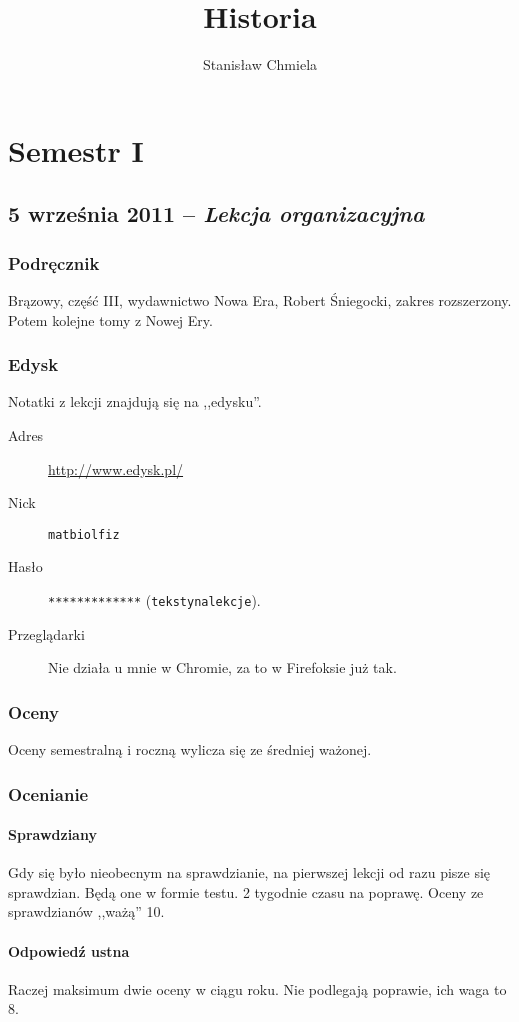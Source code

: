 \documentclass [a4paper, 11pt, oneside]{book}
\author{Stanisław Chmiela}
\title{Historia}
\begin{document}
\maketitle
\tableofcontents
\part{Semestr I}
\chapter{5 września 2011 -- \textit{Lekcja organizacyjna}}
\section{Podręcznik}
    Brązowy, część III, wydawnictwo Nowa Era, Robert Śniegocki, zakres rozszerzony. Potem kolejne tomy z Nowej Ery.
\section{Edysk}
    Notatki z lekcji znajdują się na ,,edysku''.
    \begin{description}
    \item[Adres] \href{http://www.edysk.pl/log.html}{http://www.edysk.pl/}
    \item[Nick] \texttt{matbiolfiz}
    \item[Hasło] \texttt{*************} (\texttt{tekstynalekcje}).
    \item[Przeglądarki] Nie działa u mnie w Chromie, za to w Firefoksie już tak.
    \end{description}
\section{Oceny}
    Oceny semestralną i roczną wylicza się ze średniej ważonej.
\section{Ocenianie}
    \subsection{Sprawdziany}
        Gdy się było nieobecnym na sprawdzianie, na pierwszej lekcji od razu pisze się sprawdzian. Będą one w formie testu. 2 tygodnie czasu na poprawę. Oceny ze sprawdzianów ,,ważą'' 10.
    \subsection{Odpowiedź ustna}
        Raczej maksimum dwie oceny w ciągu roku. Nie podlegają poprawie, ich waga to 8.
\end{document}

